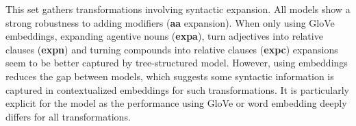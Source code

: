 This set gathers transformations involving syntactic expansion. All models show a strong robustness to adding modifiers (\textbf{aa} expansion). When only using GloVe embeddings, expanding agentive nouns (\textbf{expa}), turn adjectives into relative clauses (\textbf{expn}) and turning compounds into relative clauses (\textbf{expc}) expansions seem to be better captured by tree-structured model. However, using \bert embeddings reduces the gap between models, which suggests some syntactic information is captured in contextualized embeddings for such transformations. It is particularly explicit for the \bow model as the performance using GloVe or \bert word embedding deeply differs for all transformations. 


